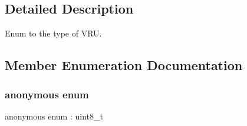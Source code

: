 \subsection{Detailed Description}
Enum to the type of V\+RU. 

\subsection{Member Enumeration Documentation}
\mbox{\label{structmaf__perception__interface_1_1VRUTypeEnum_aee3fe9654eb49327174c1b6ef761becf}} 
\subsubsection{\texorpdfstring{anonymous enum}{anonymous enum}}
{\footnotesize\ttfamily anonymous enum \+: uint8\+\_\+t}

